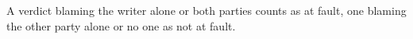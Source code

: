 A verdict blaming the writer alone or both parties counts as
at fault, one blaming the other party alone or no one as not at fault.
